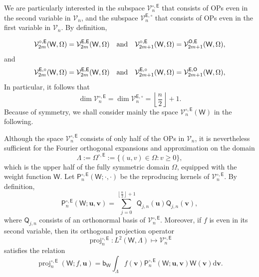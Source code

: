 \documentclass{amsart}
\theoremstyle{remark}
\def\d{\mathrm{d}}
\def\sb{{\mathsf b}}
\def\sE{{\mathsf E}}
\def\sO{{\mathsf O}}
\def\sP{{\mathsf P}}
\def\sQ{{\mathsf Q}}
\def\sW{{\mathsf W}}
\def\ub{{\mathbf u}}
\def\vb{{\mathbf v}}
\def\CV{{\mathcal V}}
\def\proj{\operatorname{proj}}
\begin{document}
We are particularly interested in the subspace $\CV_n^{\circ, \sE}$ that consists of OPs even in the second variable in 
$\CV_n$, and the subspace $\CV_n^{\sE, \circ}$ that consists of OPs even in the first variable in $\CV_n$. By definition, 

$$
  \CV_{2m}^{\circ, \sE}(\sW, \Omega) = \CV_{2m}^{\sE,\sE} (\sW, \Omega) \quad\hbox{and}\quad
    \CV_{2m+1}^{\circ, \sE}(\sW, \Omega) = \CV_{2m+1}^{\sO,\sE} (\sW, \Omega),
$$
and
$$
  \CV_{2m}^{\sE,\circ}(\sW, \Omega) = \CV_{2m}^{\sE,\sE} (\sW, \Omega) \quad\hbox{and}\quad
    \CV_{2m+1}^{\sE,\circ}(\sW, \Omega) = \CV_{2m+1}^{\sE,\sO} (\sW, \Omega),
$$
In particular, it follows that
$$
  \dim \CV_n^{\circ, \sE} =    \dim \CV_n^{\sE, \circ}  = \left \lfloor \frac{n}2 \right \rfloor + 1.
$$
Because of symmetry, we shall consider mainly the space $\CV_{n}^{\circ, \sE}(\sW)$ in the following. 

Although the space $\CV_n^{\circ, \sE}$ consists of only half of the OPs in $\CV_n$, it is nevertheless sufficient 
for the Fourier orthogonal expansions and approximation on the domain 
\begin{equation} \label{eq:Lambda-gen}
   \Lambda := \Omega^{\circ, \sE} := \{(u,v) \in \Omega: v \ge 0\},
\end{equation}
which is the upper half of the fully symmetric domain $\Omega$, equipped with the weight function $\sW$.
Let $\sP_n^{\circ, \sE}(\sW; \cdot,\cdot)$ be the reproducing kernels of $\CV_n^{\circ, \sE}$. By definition,
$$
   \sP_n^{\circ, \sE}(\sW; \ub,\vb) = \sum_{j=0}^{ \left \lfloor \frac{n}2 \right \rfloor + 1} \sQ_{j,n}(\ub) \sQ_{j,n}(\vb),
$$
where $\sQ_{j,n}$ consists of an orthonormal basis of  $\CV_n^{\circ, \sE}$. Moreover, if $f$ is even in its 
second variable, then its orthogonal projection operator 
$$
\proj_n^{\circ, \sE} : L^2(\sW, \Lambda) \mapsto \CV_n^{\circ, \sE}
$$
satisfies the relation
$$
  \proj_n^{\circ, \sE}(\sW; f, \ub) = \sb_\sW \int_\Lambda f(\vb) \sP_n^{\circ, \sE}(\sW; \ub,\vb) \sW(\vb) \d \vb.
$$
\end{document}
